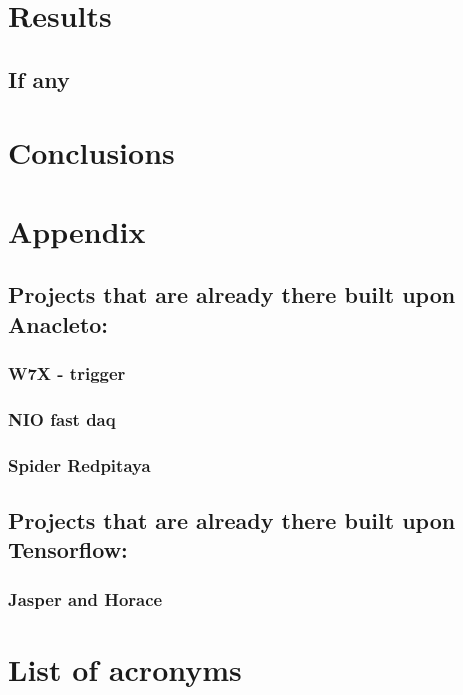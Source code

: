 \documentclass{report}
\begin{document}
\chapter{Results}
\section{If any}

\chapter{Conclusions}

\chapter{Appendix}
\section{Projects that are already there built upon Anacleto:}
\subsection{W7X - trigger }
\subsection{NIO fast daq}
\subsection{Spider Redpitaya}
\section{Projects that are already there built upon Tensorflow:}
\subsection{Jasper and Horace }

\printindex

\newpage
\chapter*{List of acronyms}



\newpage


\end{document}
